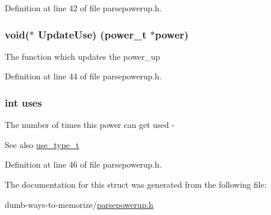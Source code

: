 Definition at line 42 of file parsepowerup.\+h.

\subsubsection[{\texorpdfstring{Update\+Use}{UpdateUse}}]{\setlength{\rightskip}{0pt plus 5cm}void($\ast$ Update\+Use) ({\bf power\+\_\+t} $\ast$power)}\hypertarget{structpower__s_a3cad653c3718314662c4a98659778999}{}\label{structpower__s_a3cad653c3718314662c4a98659778999}
The function which updates the power\+\_\+up 

Definition at line 44 of file parsepowerup.\+h.

\subsubsection[{\texorpdfstring{uses}{uses}}]{\setlength{\rightskip}{0pt plus 5cm}int uses}\hypertarget{structpower__s_ab8646ebc46bf478ca09510b7a01c7223}{}\label{structpower__s_ab8646ebc46bf478ca09510b7a01c7223}
The number of times this power can get used -\/ \begin{DoxySeeAlso}{See also}
\hyperlink{parsepowerup_8h_a2231c1a21540cc394825ca5e5df7cab4}{use\+\_\+type\+\_\+t} 
\end{DoxySeeAlso}


Definition at line 46 of file parsepowerup.\+h.



The documentation for this struct was generated from the following file\+:\begin{DoxyCompactItemize}
\item 
dumb-\/ways-\/to-\/memorize/\hyperlink{parsepowerup_8h}{parsepowerup.\+h}\end{DoxyCompactItemize}
